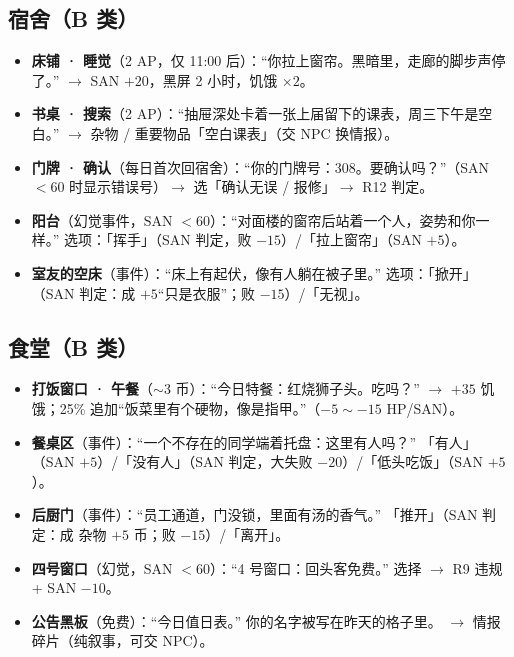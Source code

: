 \documentclass[UTF8, fontset=none, 11pt]{ctexart}
\begin{document}
\subsection{宿舍（B 类）}
\begin{itemize}
  \item \textbf{床铺 · 睡觉}（2 AP，仅 11:00 后）：``你拉上窗帘。黑暗里，走廊的脚步声停了。'' $\to$ SAN $+20$，黑屏 2 小时，饥饿 $\times 2$。
  \item \textbf{书桌 · 搜索}（2 AP）：``抽屉深处卡着一张上届留下的课表，周三下午是空白。'' $\to$ 杂物 / 重要物品「空白课表」（交 NPC 换情报）。
  \item \textbf{门牌 · 确认}（每日首次回宿舍）：``你的门牌号：308。要确认吗？''（SAN $<60$ 时显示错误号）$\to$ 选「确认无误 / 报修」$\to$ R12 判定。
  \item \textbf{阳台}（幻觉事件，SAN $<60$）：``对面楼的窗帘后站着一个人，姿势和你一样。'' 选项：「挥手」（SAN 判定，败 $-15$）/「拉上窗帘」（SAN $+5$）。
  \item \textbf{室友的空床}（事件）：``床上有起伏，像有人躺在被子里。'' 选项：「掀开」（SAN 判定：成 $+5$``只是衣服''；败 $-15$）/「无视」。
\end{itemize}

\subsection{食堂（B 类）}
\begin{itemize}
  \item \textbf{打饭窗口 · 午餐}（$\sim$3 币）：``今日特餐：红烧狮子头。吃吗？'' $\to$ $+35$ 饥饿；25\% 追加``饭菜里有个硬物，像是指甲。''（$-5\sim-15$ HP/SAN）。
  \item \textbf{餐桌区}（事件）：``一个不存在的同学端着托盘：这里有人吗？'' 「有人」（SAN $+5$）/「没有人」（SAN 判定，大失败 $-20$）/「低头吃饭」（SAN $+5$）。
  \item \textbf{后厨门}（事件）：``员工通道，门没锁，里面有汤的香气。'' 「推开」（SAN 判定：成 杂物 $+5$ 币；败 $-15$）/「离开」。
  \item \textbf{四号窗口}（幻觉，SAN $<60$）：``4 号窗口：回头客免费。'' 选择 $\to$ R9 违规 + SAN $-10$。
  \item \textbf{公告黑板}（免费）：``今日值日表。'' 你的名字被写在昨天的格子里。 $\to$ 情报碎片（纯叙事，可交 NPC）。
\end{itemize}
\end{document}
